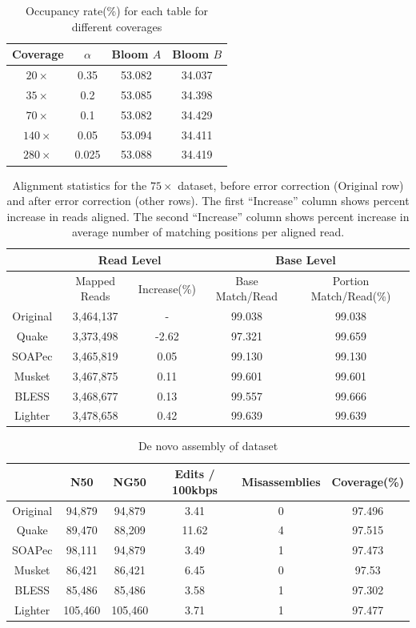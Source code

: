 \documentclass{bmcart}
\begin{document}
\begin{backmatter}
\begin{table}[h!] %
\caption{Occupancy rate(\%) for each table for different coverages}
\begin{tabular}{|c|c|c|c|}\hline
Coverage & $\alpha$ & Bloom $A$ & Bloom $B$ \\ \hline
$20\times$	& 0.35 & 53.082 & 34.037 \\ \hline
$35\times$ & 0.2 & 53.085 &34.398\\ \hline
$70\times$ & 0.1 &53.082 & 34.429 \\ \hline
$140\times$ & 0.05 & 53.094 &34.411  \\ \hline
$280\times$ & 0.025 & 53.088 &34.419\\ \hline
\end{tabular}
\end{table}

\begin{table}[h!] %
\caption{Alignment statistics for the $75\times$ \ecoli dataset, before error correction (Original row) and after error correction (other rows).  The first ``Increase'' column shows percent increase in reads aligned.  The second ``Increase'' column shows percent increase in average number of matching positions per aligned read.}
\begin{tabular}{|c|c|c||c|c|} \hline
	 & \multicolumn{2}{|c||}{Read Level} & \multicolumn{2}{|c|}{Base Level} \\ \hline
     & Mapped Reads & Increase(\%) & Base Match/Read & Portion Match/Read(\%) \\ \hline
Original & 	3,464,137	 & - & 99.038	& 99.038 \\ \hline
Quake	& 3,373,498	& -2.62	& 97.321	& 99.659  \\ \hline
SOAPec  & 3,465,819 & 0.05 &  99.130 & 99.130 \\ \hline
Musket	& 3,467,875	& 0.11	& 99.601	& 99.601 \\ \hline
BLESS	& 3,468,677& 0.13	& 99.557	& 99.666  \\ \hline
Lighter	&  3,478,658	& 0.42	& 99.639	& 99.639  \\ \hline
\end{tabular}
\end{table}

\begin{table}[h!] %
\caption{De novo assembly of \ecoli dataset}
\begin{tabular}{|c|c|c|c|c|c|} \hline
	 	& N50 &	NG50	 & Edits / 100kbps&	Misassemblies	& Coverage(\%) \\ \hline
Original &	94,879 &	94,879	& 3.41	& 0	& 97.496  \\ \hline
Quake	& 89,470 &	88,209	& 11.62	& 4	 & 97.515  \\ \hline
SOAPec	& 98,111 &	94,879	& 3.49	& 1	& 97.473	\\ \hline
Musket	& 86,421  &	86,421	& 6.45	& 0	 & 97.53 \\ \hline
BLESS	& 85,486  &	85,486	& 3.58	& 1	& 97.302  \\ \hline
Lighter	& 105,460 &	105,460	& 3.71	& 1	& 97.477  \\ \hline
\end{tabular}
\end{table}



\end{backmatter}
\end{document}
